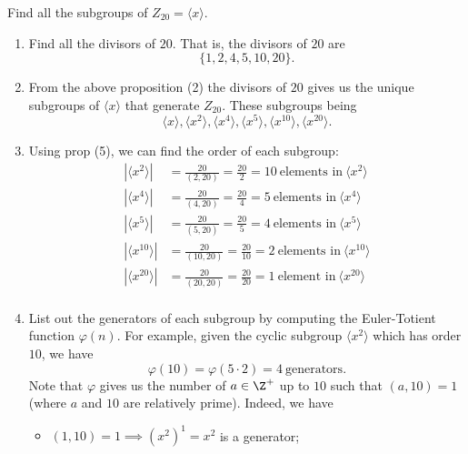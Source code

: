 \begin{eg}
    Find all the subgroups of \( Z_{20} = \langle x  \rangle  \). 
    \begin{enumerate}
        \item[(1)] Find all the divisors of \( 20 \). That is, the divisors of \( 20  \) are 
            \[  \{ 1,2,4,5,10,20 \}. \]
        \item[(2)] From the above proposition (2) the divisors of \( 20  \) gives us the unique subgroups of \( \langle x  \rangle \) that generate \( Z_{20} \). These subgroups being 
            \[  \langle x \rangle, \langle x^{2} \rangle, \langle x^{4} \rangle, \langle x^{5} \rangle, \langle x^{10} \rangle, \langle x^{20} \rangle. \]
        \item[(3)] Using prop (5), we can find the order of each subgroup:
            \begin{align*}
                | \langle x^{2} \rangle | &= \frac{ 20 }{ (2,20) }  = \frac{ 20 }{ 2 }  = 10 \ \text{elements in} \ \langle x^{2} \rangle \\
                | \langle x^{4} \rangle |  &= \frac{ 20 }{ (4,20) } = \frac{ 20 }{ 4 } = 5 \ \text{elements in} \ \langle x^{4} \rangle \\
                | \langle x^{5} \rangle |  &= \frac{ 20 }{ (5,20) } = \frac{ 20 }{ 5 } = 4 \ \text{elements in} \ \langle x^{5} \rangle \\
                | \langle x^{10} \rangle |  &= \frac{ 20 }{ (10,20) } = \frac{ 20 }{ 10 } = 2 \ \text{elements in} \ \langle x^{10} \rangle \\
                | \langle x^{20} \rangle |  &= \frac{ 20 }{ (20,20) } = \frac{ 20 }{ 20 } = 1 \ \text{element in} \ \langle x^{20} \rangle \\
            \end{align*}
        \item[(4)] List out the generators of each subgroup by computing the Euler-Totient function \( \varphi(n) \). For example, given the cyclic subgroup \( \langle x^{2} \rangle \) which has order \( 10 \), we have 
            \[  \varphi(10) = \varphi(5 \cdot 2) = 4 \ \text{generators}.  \]
            Note that \( \varphi \) gives us the number of \( a \in \Z^{+} \) up to \( 10 \) such that \( (a,10) = 1  \) (where \( a  \) and \( 1 0 \) are relatively prime). Indeed, we have 
            \begin{itemize}
                \item \( (1,10) = 1 \implies (x^{2})^{1} = x^{2} \) is a generator;

\end{itemize}
\end{enumerate}
\end{eg}

